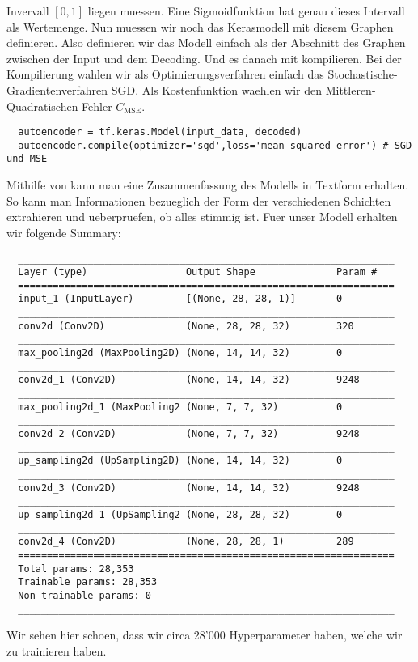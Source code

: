 Invervall $[0,1]$ liegen muessen. Eine Sigmoidfunktion hat genau dieses
Intervall als Wertemenge.
\para{}
Nun muessen wir noch das Kerasmodell mit diesem Graphen definieren. Also
definieren wir das Modell einfach als der Abschnitt des Graphen zwischen der
Input und dem Decoding.
Und es danach mit kompilieren. Bei der Kompilierung wahlen wir als
Optimierungsverfahren einfach das Stochastische-Gradientenverfahren SGD. Als
Kostenfunktion waehlen wir den Mittleren-Quadratischen-Fehler $C_{\text{MSE}}$.
\begin{verbatim}
  autoencoder = tf.keras.Model(input_data, decoded)
  autoencoder.compile(optimizer='sgd',loss='mean_squared_error') # SGD und MSE
\end{verbatim}
Mithilfe von  kann man eine Zusammenfassung des
Modells in Textform erhalten. So kann man Informationen bezueglich der Form der
verschiedenen Schichten extrahieren und ueberpruefen, ob alles stimmig ist.
Fuer unser Modell erhalten wir folgende Summary:
\begin{verbatim}
  _________________________________________________________________
  Layer (type)                 Output Shape              Param #
  =================================================================
  input_1 (InputLayer)         [(None, 28, 28, 1)]       0
  _________________________________________________________________
  conv2d (Conv2D)              (None, 28, 28, 32)        320
  _________________________________________________________________
  max_pooling2d (MaxPooling2D) (None, 14, 14, 32)        0
  _________________________________________________________________
  conv2d_1 (Conv2D)            (None, 14, 14, 32)        9248
  _________________________________________________________________
  max_pooling2d_1 (MaxPooling2 (None, 7, 7, 32)          0
  _________________________________________________________________
  conv2d_2 (Conv2D)            (None, 7, 7, 32)          9248
  _________________________________________________________________
  up_sampling2d (UpSampling2D) (None, 14, 14, 32)        0
  _________________________________________________________________
  conv2d_3 (Conv2D)            (None, 14, 14, 32)        9248
  _________________________________________________________________
  up_sampling2d_1 (UpSampling2 (None, 28, 28, 32)        0
  _________________________________________________________________
  conv2d_4 (Conv2D)            (None, 28, 28, 1)         289
  =================================================================
  Total params: 28,353
  Trainable params: 28,353
  Non-trainable params: 0
  _________________________________________________________________
\end{verbatim}
Wir sehen hier schoen, dass wir circa 28'000 Hyperparameter haben, welche wir zu
trainieren haben.

